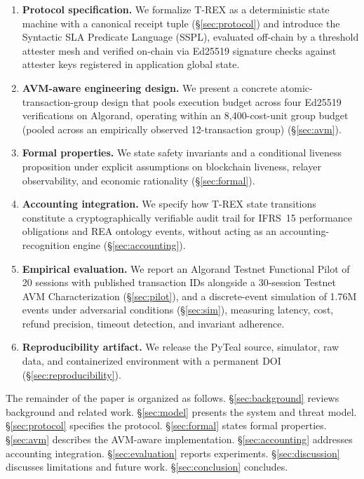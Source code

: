 \documentclass[journal]{IEEEtran}
\begin{document}
\begin{enumerate}[label=\textbf{C\arabic*.},leftmargin=*]
\item \textbf{Protocol specification.}
We formalize T-REX as a deterministic state machine with a canonical
receipt tuple (\S\ref{sec:protocol}) and introduce the Syntactic SLA
Predicate Language (SSPL), evaluated off-chain by a threshold attester
mesh and verified on-chain via Ed25519 signature checks against
attester keys registered in application global state.
\item \textbf{AVM-aware engineering design.}
We present a concrete atomic-transaction-group design that pools
execution budget across four Ed25519 verifications on Algorand,
operating within an 8{,}400-cost-unit group budget (pooled across
an empirically observed 12-transaction group) (\S\ref{sec:avm}).
\item \textbf{Formal properties.}
We state safety invariants and a conditional liveness proposition
under explicit assumptions on blockchain liveness, relayer
observability, and economic rationality (\S\ref{sec:formal}).
\item \textbf{Accounting integration.}
We specify how T-REX state transitions constitute a cryptographically
verifiable audit trail for IFRS~15 performance obligations and REA
ontology events, without acting as an accounting-recognition engine
(\S\ref{sec:accounting}).
\item \textbf{Empirical evaluation.}
We report an Algorand Testnet Functional Pilot of 20 sessions with
published transaction IDs alongside a 30-session Testnet AVM
Characterization (\S\ref{sec:pilot}), and a discrete-event simulation
of 1.76M events under adversarial conditions (\S\ref{sec:sim}),
measuring latency, cost, refund precision, timeout detection, and
invariant adherence.
\item \textbf{Reproducibility artifact.}
We release the PyTeal source, simulator, raw data, and containerized
environment with a permanent DOI (\S\ref{sec:reproducibility}).
\end{enumerate}

\noindent The remainder of the paper is organized as follows.
\S\ref{sec:background} reviews background and related work.
\S\ref{sec:model} presents the system and threat model.
\S\ref{sec:protocol} specifies the protocol.
\S\ref{sec:formal} states formal properties.
\S\ref{sec:avm} describes the AVM-aware implementation.
\S\ref{sec:accounting} addresses accounting integration.
\S\ref{sec:evaluation} reports experiments.
\S\ref{sec:discussion} discusses limitations and future work.
\S\ref{sec:conclusion} concludes.
\end{document}
